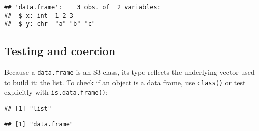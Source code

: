 \begin{Shaded}
\begin{Highlighting}[]
\StringTok{ }\NormalTok{(}
   \OperatorTok{:}\NormalTok{,}
   \NormalTok{(}\NormalTok{, }\NormalTok{, }\NormalTok{),}
   \NormalTok{)}
\end{Highlighting}
\end{Shaded}

\begin{verbatim}
## 'data.frame':    3 obs. of  2 variables:
##  $ x: int  1 2 3
##  $ y: chr  "a" "b" "c"
\end{verbatim}

\hypertarget{testing-and-coercion}{%
\subsection{Testing and coercion}\label{testing-and-coercion}}

Because a \texttt{data.frame} is an S3 class, its type reflects the
underlying vector used to build it: the list. To check if an object is a
data frame, use \texttt{class()} or test explicitly with
\texttt{is.data.frame()}:

\begin{Shaded}
\begin{Highlighting}[]
\end{Highlighting}
\end{Shaded}

\begin{verbatim}
## [1] "list"
\end{verbatim}

\begin{Shaded}
\begin{Highlighting}[]
\end{Highlighting}
\end{Shaded}

\begin{verbatim}
## [1] "data.frame"
\end{verbatim}

\begin{Shaded}
\begin{Highlighting}[]
\end{Highlighting}
\end{Shaded}

